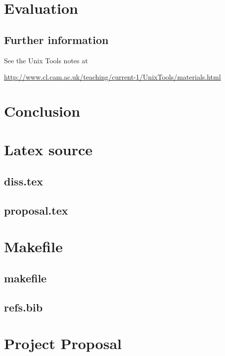\documentclass[12pt,a4paper,twoside,openright]{report}
\begin{document}
\chapter{Evaluation}

\section{Further information}

See the Unix Tools notes at

\url{http://www.cl.cam.ac.uk/teaching/current-1/UnixTools/materials.html}


\chapter{Conclusion}




\appendix

\chapter{Latex source}

\section{diss.tex}
{\scriptsize}

\section{proposal.tex}
{\scriptsize}

\chapter{Makefile}

\section{makefile}\label{makefile}
{\scriptsize}

\section{refs.bib}
{\scriptsize}


\chapter{Project Proposal}


\end{document}

